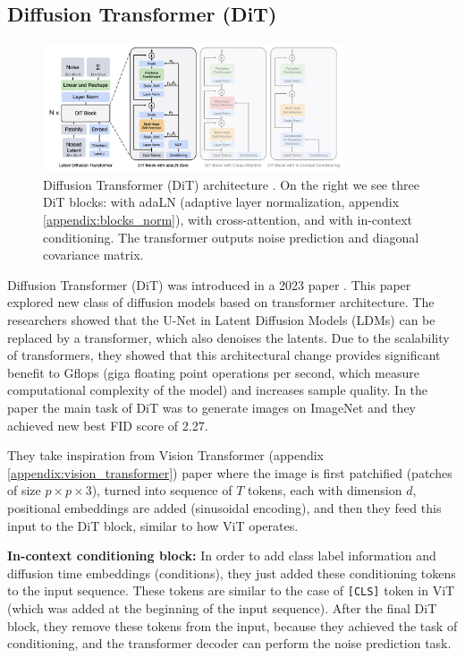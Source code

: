 \subsection{Diffusion Transformer (DiT)}
\label{appendix:diffusion_transformer}

\begin{figure}
    \centering
    \includegraphics[width=0.8\textwidth]{images/appendix/diffusion_transformer/architecture.png}
    \caption{Diffusion Transformer (DiT) architecture \cite{diffusion_transformer}. On the right we see three DiT blocks: with adaLN (adaptive layer normalization, appendix \ref{appendix:blocks_norm}), with cross-attention, and with in-context conditioning. The transformer outputs noise prediction and diagonal covariance matrix.}
    \label{fig:diffusion_transformer_architecture}
\end{figure}

Diffusion Transformer (DiT) was introduced in a 2023 paper \cite{diffusion_transformer}. This paper explored new class of diffusion models based on transformer architecture. The researchers showed that the U-Net in Latent Diffusion Models (LDMs) can be replaced by a transformer, which also denoises the latents. Due to the scalability of transformers, they showed that this architectural change provides significant benefit to Gflops (giga floating point operations per second, which measure computational complexity of the model) and increases sample quality. In the paper the main task of DiT was to generate images on ImageNet and they achieved new best FID score of 2.27.

They take inspiration from Vision Transformer \cite{vision_transformer} (appendix \ref{appendix:vision_transformer}) paper where the image is first patchified (patches of size $p \times p \times 3$), turned into sequence of $T$ tokens, each with dimension $d$, positional embeddings are added (sinusoidal encoding), and then they feed this input to the DiT block, similar to how ViT operates.

\textbf{In-context conditioning block:} In order to add class label information and diffusion time embeddings (conditions), they just added these conditioning tokens to the input sequence. These tokens are similar to the case of \texttt{[CLS]} token in ViT (which was added at the beginning of the input sequence). After the final DiT block, they remove these tokens from the input, because they achieved the task of conditioning, and the transformer decoder can perform the noise prediction task.

